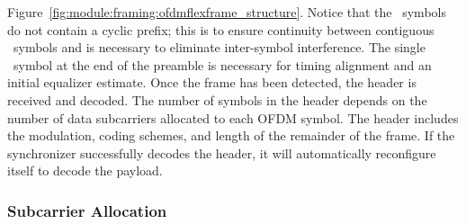 Figure~\ref{fig:module:framing:ofdmflexframe_structure}.
Notice that the \Ss\ symbols do not contain a cyclic prefix;
this is to ensure continuity between contiguous \Ss\ symbols and is
necessary to eliminate inter-symbol interference.
The single \Sl\ symbol at the end of the preamble is necessary for
timing alignment and an initial equalizer estimate.
Once the frame has been detected, the header is received and decoded.
The number of symbols in the header depends on the number of data
subcarriers allocated to each OFDM symbol.
The header includes the modulation, coding schemes, and length of the
remainder of the frame.
If the synchronizer successfully decodes the header, it will
automatically reconfigure itself to decode the payload.

\subsubsection{Subcarrier Allocation}
\label{module:framing:ofdmflexframe:subcarrier_allocation}

